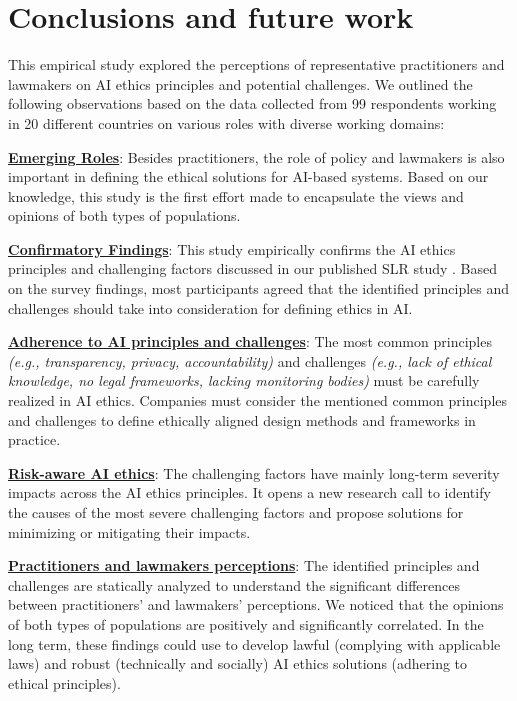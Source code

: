 \section{Conclusions and future work}
\label{LessonsLearned}
This empirical study explored the perceptions of representative practitioners and lawmakers on AI ethics principles and potential challenges. We outlined the following observations based on the data collected from 99 respondents working in 20 different countries on various roles with diverse working domains:

\underline{\textbf{Emerging Roles}}: Besides practitioners, the role of policy and lawmakers is also important in defining the ethical solutions for AI-based systems. Based on our knowledge, this study is the first effort made to encapsulate the views and opinions of both types of populations.

\underline{\textbf{Confirmatory Findings}}: This study empirically confirms the AI ethics principles and challenging factors discussed in our published SLR study \cite{AR13}. Based on the survey findings, most participants agreed that the identified principles and challenges should take into consideration for defining ethics in AI.

\underline{\textbf{Adherence to AI principles and challenges}}: The most common principles \textit{(e.g., transparency, privacy, accountability)} and challenges \textit{(e.g., lack of ethical knowledge, no legal frameworks, lacking monitoring bodies)} must be carefully realized in AI ethics. Companies must consider the mentioned common principles and challenges to define ethically aligned design methods and frameworks in practice.

\underline{\textbf{Risk-aware AI ethics}}: The challenging factors have mainly long-term severity impacts across the AI ethics principles. It opens a new research call to identify the causes of the most severe challenging factors and propose solutions for minimizing or mitigating their impacts.

\underline{\textbf{Practitioners and lawmakers perceptions}}: The identified principles and challenges are statically analyzed to understand the significant differences between practitioners’ and lawmakers' perceptions. We noticed that the opinions of both types of populations are positively and significantly correlated. In the long term, these findings could use to develop lawful (complying with applicable laws) and robust (technically and socially) AI ethics solutions (adhering to ethical principles)\cite{AR2}.

